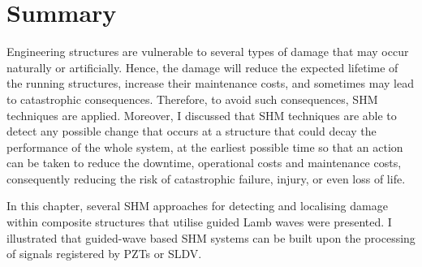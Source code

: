 \section{Summary}
\label{sec24}
Engineering structures are vulnerable to several types of damage that may occur naturally or artificially.
Hence, the damage will reduce the expected lifetime of the running structures, increase their maintenance costs, and sometimes may lead to catastrophic consequences. 
Therefore, to avoid such consequences, SHM techniques are applied.  
Moreover, I discussed that SHM techniques are able to detect any possible change that occurs at a structure that could decay the performance of the whole system, at the earliest possible time so that an action can be taken to reduce the downtime,  operational costs and maintenance costs, consequently reducing the risk of catastrophic failure, injury, or even loss of life.

In this chapter,  several SHM approaches for detecting and localising damage within composite structures that utilise guided Lamb waves were presented. 
I illustrated that guided-wave based SHM systems can be built upon the processing of signals registered by PZTs or SLDV. 
